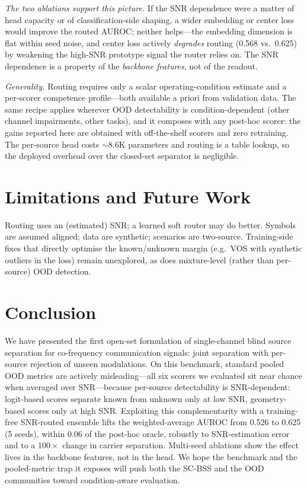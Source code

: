 \documentclass[review,12pt]{elsarticle}
\begin{document}
\emph{The two ablations support this picture.} If the SNR dependence
were a matter of head capacity or of classification-side shaping, a
wider embedding or center loss would improve the routed AUROC; neither
helps---the embedding dimension is flat within seed noise, and center
loss actively \emph{degrades} routing (0.568 vs.\ 0.625) by weakening
the high-SNR prototype signal the router relies on. The SNR dependence
is a property of the \emph{backbone features}, not of the readout.

\emph{Generality.} Routing requires only a scalar operating-condition
estimate and a per-scorer competence profile---both available a priori
from validation data. The same recipe applies wherever OOD detectability
is condition-dependent (other channel impairments, other tasks), and it
composes with any post-hoc scorer: the gains reported here are obtained
with off-the-shelf scorers and zero retraining. The per-source head
costs $\sim$8.6K parameters and routing is a table lookup, so the
deployed overhead over the closed-set separator is negligible.

\section{Limitations and Future Work}
\label{sec:limit}

Routing uses an (estimated) SNR; a learned soft router may do better.
Symbols are assumed aligned; data are synthetic; scenarios are
two-source. Training-side fixes that directly optimise the known/unknown
margin (e.g.\ VOS with synthetic outliers in the loss) remain unexplored,
as does mixture-level (rather than per-source) OOD detection.

\section{Conclusion}
\label{sec:concl}

We have presented the first open-set formulation of single-channel blind
source separation for co-frequency communication signals: joint
separation with per-source rejection of unseen modulations. On this
benchmark, standard pooled OOD metrics are actively misleading---all six
scorers we evaluated sit near chance when averaged over SNR---because
per-source detectability is SNR-dependent: logit-based scores separate
known from unknown only at low SNR, geometry-based scores only at high
SNR. Exploiting this complementarity with a training-free SNR-routed
ensemble lifts the weighted-average AUROC from 0.526 to 0.625 (5 seeds),
within 0.06 of the post-hoc oracle, robustly to SNR-estimation error and
to a $100\times$ change in carrier separation. Multi-seed ablations show
the effect lives in the backbone features, not in the head. We hope the
benchmark and the pooled-metric trap it exposes will push both the
SC-BSS and the OOD communities toward condition-aware evaluation.
\end{document}
